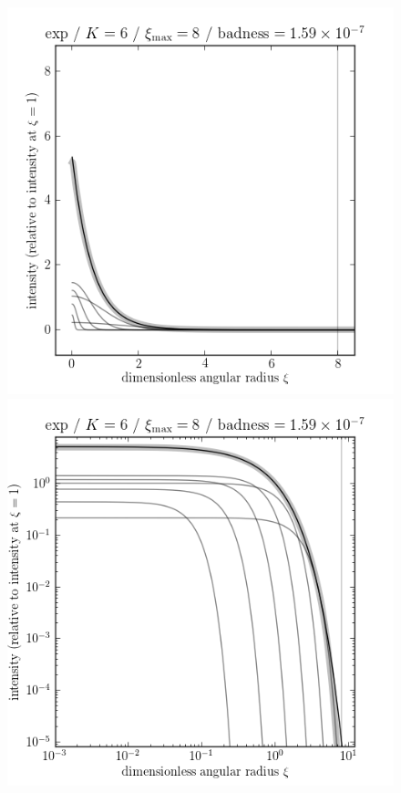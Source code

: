 \documentclass[12pt,pdftex,preprint]{aastex}
\newlength{\figurewidth}
\begin{document}
\clearpage
\begin{figure}
\includegraphics[width=\figurewidth]{exp_K06_MR08_profile.png}%
\includegraphics[width=\figurewidth]{exp_K06_MR08_profile_log.png}\\

\end{figure}
\end{document}
